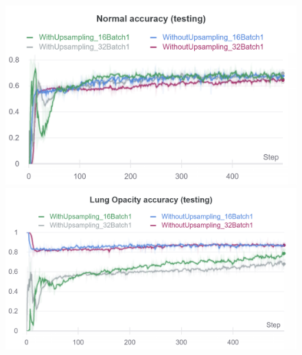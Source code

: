 \documentclass{article}
\begin{document}
\begin{figure}[!htb]
\includegraphics[width=\linewidth]{charts/Section-3-Panel-4-1747d9w1z}
\caption{}
\endminipage\hfill
{}
\includegraphics[width=\linewidth]{charts/Section-3-Panel-5-xkatp52si}
\caption{}
\endminipage
\end{figure}
\end{document}
